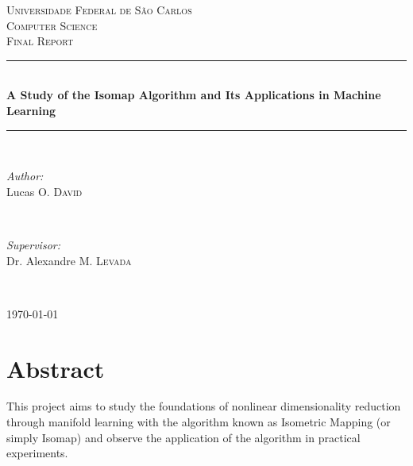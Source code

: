\documentclass[12pt]{article}
\begin{document}
\begin{titlepage}

\newcommand{\HRule}{\rule{\linewidth}{0.5mm}}

\center

\textsc{\LARGE Universidade Federal de São Carlos}\\[1.5cm]
\textsc{\Large Computer Science}\\[0.5cm]
\textsc{\large Final Report}\\[0.5cm]

\HRule \\[0.4cm]

{ \huge \bfseries A Study of the Isomap Algorithm and Its Applications in Machine Learning}\\[0.4cm]

\HRule \\[1.5cm]

\begin{minipage}{0.4\textwidth}
\begin{flushleft} \large
\emph{Author:}\\
Lucas O. \textsc{David}
\end{flushleft}
\end{minipage}
~
\begin{minipage}{0.4\textwidth}
\begin{flushright} \large
\emph{Supervisor:} \\
Dr. Alexandre M. \textsc{Levada}
\end{flushright}
\end{minipage}\\[4cm]

\vfill

{\large \today}\\[3cm]

\end{titlepage}

\tableofcontents
\newpage

\thispagestyle{empty}
\listoffigures
\newpage

\thispagestyle{empty}
\listoftables
\newpage

\section{Abstract}

This project aims to study the foundations of nonlinear dimensionality reduction through manifold learning with the algorithm known as Isometric Mapping (or simply Isomap) and observe the application of the algorithm in practical experiments.
\end{document}
